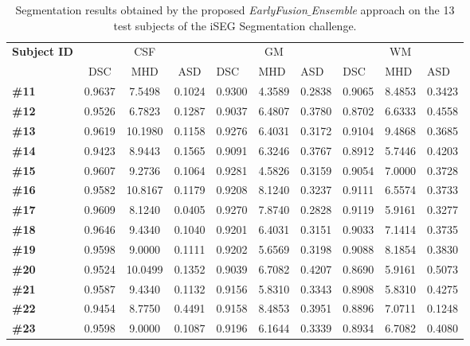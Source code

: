 \documentclass[twoside,espcrc2]{elsarticle}
\begin{document}
\begin{table}[ht!]
\centering
\caption{Segmentation results obtained by the proposed \textit{EarlyFusion$\_$Ensemble} approach on the 13 test subjects of the iSEG Segmentation challenge.}
\label{table:resultsSingle}
\begin{small}
\begin{tabular}{lccccccccc}
\toprule
\multirow{2}[3]{*}{\textbf{Subject ID}} & \multicolumn{3}{c}{{CSF}} & \multicolumn{3}{c}{{GM}} & \multicolumn{3}{c}{{WM}} \\
\cmidrule(lr){2-4}\cmidrule(lr){5-7}\cmidrule(lr){8-10}
& {DSC} & {MHD} & {ASD} & \multicolumn{1}{l}{{DSC}} & \multicolumn{1}{l}{{MHD}} & \multicolumn{1}{l}{{ASD}} & \multicolumn{1}{l}{{DSC}} & \multicolumn{1}{l}{{MHD}} & \multicolumn{1}{l}{{ASD}} \\
\midrule\midrule
\textbf{\#11} & 0.9637 & 7.5498 & 0.1024 & 0.9300 & 4.3589 & 0.2838 &  0.9065 & 8.4853 & 0.3423 \\
\textbf{\#12} & 0.9526 & 6.7823 & 0.1287 & 0.9037 & 6.4807 & 0.3780 & 0.8702 & 6.6333  &  0.4558 \\
\textbf{\#13} & 0.9619 & 10.1980 & 0.1158 & 0.9276 & 6.4031 & 0.3172 & 0.9104 & 9.4868 & 0.3685 \\ 
\textbf{\#14} & 0.9423 & 8.9443  & 0.1565 & 0.9091 & 6.3246  & 0.3767 &  0.8912 & 5.7446 &  0.4203 \\
\textbf{\#15} & 0.9607 & 9.2736  & 0.1064 & 0.9281 & 4.5826 & 0.3159 & 0.9054 & 7.0000 & 0.3728 \\
\textbf{\#16} & 0.9582 & 10.8167 & 0.1179 & 0.9208 & 8.1240  & 0.3237 & 0.9111  & 6.5574 & 0.3733 \\
\textbf{\#17} & 0.9609 & 8.1240 & 0.0405 & 0.9270 & 7.8740 & 0.2828 & 0.9119 & 5.9161 & 0.3277 \\
\textbf{\#18} & 0.9646 & 9.4340 & 0.1040 & 0.9201 & 6.4031 & 0.3151 & 0.9033 & 7.1414 & 0.3735 \\
\textbf{\#19} & 0.9598 & 9.0000 & 0.1111 & 0.9202 & 5.6569 & 0.3198  & 0.9088 & 8.1854 & 0.3830 \\
\textbf{\#20} & 0.9524 & 10.0499 & 0.1352 & 0.9039 & 6.7082 & 0.4207 & 0.8690 & 5.9161 & 0.5073 \\
\textbf{\#21} & 0.9587 & 9.4340 & 0.1132 & 0.9156  & 5.8310 & 0.3343 &  0.8908 & 5.8310 & 0.4275 \\
\textbf{\#22} & 0.9454 & 8.7750 & 0.4491 & 0.9158 & 8.4853 & 0.3951 & 0.8896 & 7.0711 & 0.1248 \\
\textbf{\#23} & 0.9598 & 9.0000 & 0.1087 & 0.9196  & 6.1644 & 0.3339  & 0.8934 & 6.7082 & 0.4080 \\
\bottomrule
\end{tabular}
\end{small}
\end{table}
\end{document}
